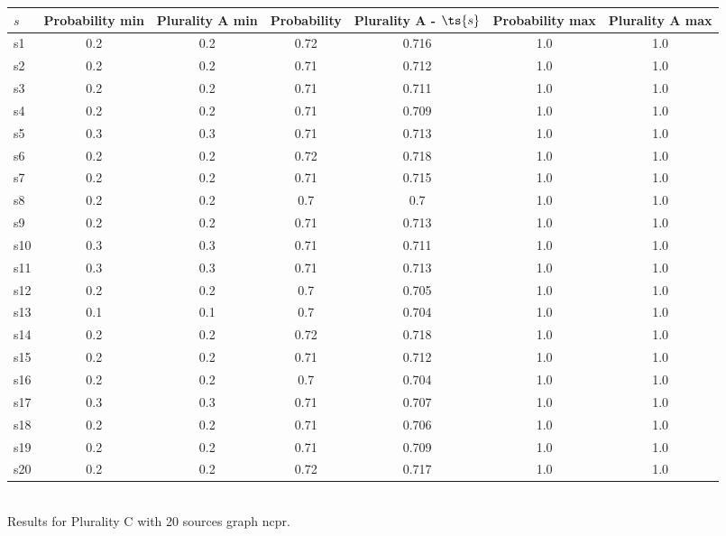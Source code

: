 \documentclass{article}
\begin{document}
\noindent\begin{tabular}{|l|c|c|c|c|c|c|}
\hline
$s$& Probability min & Plurality A min & Probability & Plurality A - $\ts{s}$ & Probability max & Plurality A max\\
\hline
s1 &0.2 & 0.2 & 0.72 & 0.716 & 1.0 & 1.0\\
\hline
s2 &0.2 & 0.2 & 0.71 & 0.712 & 1.0 & 1.0\\
\hline
s3 &0.2 & 0.2 & 0.71 & 0.711 & 1.0 & 1.0\\
\hline
s4 &0.2 & 0.2 & 0.71 & 0.709 & 1.0 & 1.0\\
\hline
s5 &0.3 & 0.3 & 0.71 & 0.713 & 1.0 & 1.0\\
\hline
s6 &0.2 & 0.2 & 0.72 & 0.718 & 1.0 & 1.0\\
\hline
s7 &0.2 & 0.2 & 0.71 & 0.715 & 1.0 & 1.0\\
\hline
s8 &0.2 & 0.2 & 0.7 & 0.7 & 1.0 & 1.0\\
\hline
s9 &0.2 & 0.2 & 0.71 & 0.713 & 1.0 & 1.0\\
\hline
s10 &0.3 & 0.3 & 0.71 & 0.711 & 1.0 & 1.0\\
\hline
s11 &0.3 & 0.3 & 0.71 & 0.713 & 1.0 & 1.0\\
\hline
s12 &0.2 & 0.2 & 0.7 & 0.705 & 1.0 & 1.0\\
\hline
s13 &0.1 & 0.1 & 0.7 & 0.704 & 1.0 & 1.0\\
\hline
s14 &0.2 & 0.2 & 0.72 & 0.718 & 1.0 & 1.0\\
\hline
s15 &0.2 & 0.2 & 0.71 & 0.712 & 1.0 & 1.0\\
\hline
s16 &0.2 & 0.2 & 0.7 & 0.704 & 1.0 & 1.0\\
\hline
s17 &0.3 & 0.3 & 0.71 & 0.707 & 1.0 & 1.0\\
\hline
s18 &0.2 & 0.2 & 0.71 & 0.706 & 1.0 & 1.0\\
\hline
s19 &0.2 & 0.2 & 0.71 & 0.709 & 1.0 & 1.0\\
\hline
s20 &0.2 & 0.2 & 0.72 & 0.717 & 1.0 & 1.0\\
\hline
\end{tabular}\\

\noindent Results for Plurality C with 20 sources graph ncpr.
\end{document}
